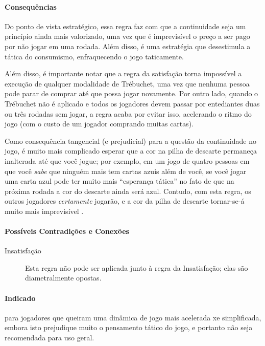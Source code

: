 \paragraph{Consequências}

Do ponto de vista estratégico, essa regra faz com que a continuidade seja um princípio ainda mais valorizado, uma vez que é imprevisível o preço a ser pago por não jogar em uma rodada. Além disso, é uma estratégia que desestimula a tática do consumismo, enfraquecendo o jogo taticamente.

Além disso, é importante notar que a regra da satisfação torna impossível a execução de qualquer modalidade de Trébuchet, uma vez que nenhuma pessoa pode parar de comprar até que possa jogar novamente. Por outro lado, quando o Trébuchet não é aplicado e todos os jogadores devem passar por entediantes duas ou três rodadas sem jogar, a regra acaba por evitar isso, acelerando o ritmo do jogo (com o custo de um jogador comprando muitas cartas).

Como consequência tangencial (e prejudicial) para a questão da continuidade no jogo, é muito mais complicado esperar que a cor na pilha de descarte permaneça inalterada até que você jogue; por exemplo, em um jogo de quatro pessoas em que você \emph{sabe} que ninguém mais tem cartas azuis além de você, se você jogar uma carta azul pode ter muito mais ``esperança tática'' no fato de que na próxima rodada a cor do descarte ainda será azul. Contudo, com esta regra, os outros jogadores \emph{certamente} jogarão, e a cor da pilha de descarte tornar-se-á muito mais imprevisível .

\paragraph{Possíveis Contradições e Conexões}

\begin{description}
\item[Insatisfação]{Esta regra não pode ser aplicada junto à regra da Insatisfação; elas são diametralmente opostas.}
\end{description}

\paragraph{Indicado} 

para jogadores que queiram uma dinâmica de jogo mais acelerada xe simplificada, embora isto prejudique muito o pensamento tático do jogo, e portanto não seja recomendada para uso geral.

